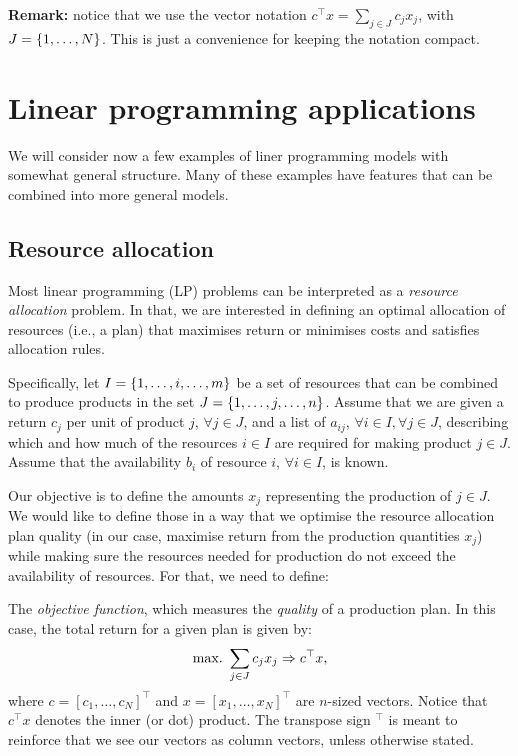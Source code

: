 {\bf Remark:} notice that we use the vector notation $c^\top x = \sum_{j \in J} c_j x_j$, with $J = \left\{ 1,\dots,N \right \}$. This is just a convenience for keeping the notation compact. 


\section{Linear programming applications}

We will consider now a few examples of liner programming models with somewhat general structure. Many of these examples have features that can be combined into more general models.


\subsection{Resource allocation} \label{section_121}

Most linear programming (LP) problems can be interpreted as a \emph{resource allocation} problem. In that, we are interested in defining an optimal allocation of resources (i.e., a plan) that maximises return or minimises costs and satisfies allocation rules. 

Specifically, let $I = \left\{ 1, \dots, i, \dots, m \right \}$ be a set of resources that can be combined to produce products in the set $J = \left\{ 1, \dots, j, \dots, n \right \}$. Assume that we are given a return $c_j$ per unit of product $j$, $\forall j \in J$, and a list of $a_{ij}$, $\forall i \in I, \forall j \in J$, describing which and how much of the resources $i \in I$ are required for making product $j \in J$. Assume that the availability $b_i$ of resource $i$, $\forall i\in I$, is known. 

Our objective is to define the amounts $x_j$ representing the production of $j \in J$. We would like to define those in a way that we optimise the resource allocation plan quality (in our case, maximise return from the production quantities $x_j$) while making sure the resources needed for production do not exceed the availability of resources. For that, we need to define: 

The \emph{objective function}, which measures the \emph{quality} of a production plan. In this case, the total return for a given plan is given by:
%
\begin{equation*}
	\mathop{\text{max.~}} \sum_{j \in J}c_jx_j \Rightarrow c^\top x,
\end{equation*}
%
where $c = [c_1, \dots, c_{N}]^\top$ and $x = [x_1, \dots, x_{N}]^\top$ are $n$-sized vectors. Notice that $c^\top x$ denotes the inner (or dot) product. The transpose sign $^\top$ is meant to reinforce that we see our vectors as column vectors, unless otherwise stated.

